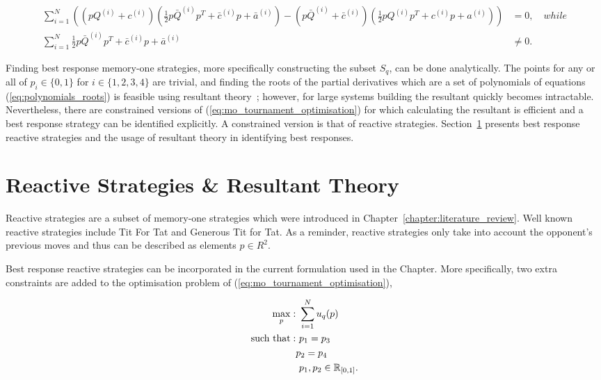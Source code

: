 {\scriptsize
\begin{align}\label{eq:polynomials_roots}
    \displaystyle\sum\limits_{i=1} ^ {N} \left(
    \left(pQ^{(i)} + c^{(i)}\right) \left(\frac{1}{2} p\bar{Q}^{(i)} p^T + \bar{c}^{(i)} p + \bar{a}^ {(i)}\right)
    - \left(p\bar{Q}^{(i)} + \bar{c}^{(i)}\right) \left(\frac{1}{2} pQ^{(i)} p^T + c^{(i)} p + a^ {(i)}\right)\right)
    &= 0, \quad {while} \\
    \displaystyle\sum\limits_{i=1} ^ {N} \frac{1}{2} p\bar{Q}^{(i)} p^T + \bar{c}^{(i)} p + \bar{a}^ {(i)} &\neq 0.
\end{align}}

Finding best response memory-one strategies, more specifically constructing the
subset \(S_q\), can be done analytically. The points for any or all of \(p_i \in
\{0, 1\}\) for \(i \in \{1, 2, 3, 4\}\) are trivial, and finding the
roots of the partial derivatives which are a set of polynomials of equations
(\ref{eq:polynomials_roots}) is feasible using resultant
theory~\cite{Jonsson2005}; however, for large systems building the resultant
quickly becomes intractable. Nevertheless, there are constrained versions of
(\ref{eq:mo_tournament_optimisation}) for which calculating
the resultant is efficient and a best response strategy can be identified
explicitly. A constrained version is that of reactive strategies.
Section~\ref{section:reactive_strategies} presents best response
reactive strategies and the usage of resultant theory in identifying best
responses.

\section{Reactive Strategies \& Resultant Theory}\label{section:reactive_strategies}

Reactive strategies are a subset of memory-one strategies which were introduced
in Chapter~\ref{chapter:literature_review}. Well known reactive strategies
include Tit For Tat and Generous Tit for Tat. As a reminder, reactive strategies
only take into account the opponent's previous moves and thus can be described
as elements \(p \in R^2\).

Best response reactive strategies can be incorporated in the current formulation
used in the Chapter. More specifically, two extra constraints are added to the
optimisation problem of (\ref{eq:mo_tournament_optimisation}),

\begin{equation}\label{eq:reactive_tournament_optimisation}
\begin{aligned}
\max_p: & \ \sum_{i=1} ^ N u_q(p)
\\
\text{such that}: & \ p_1 = p_3 \\
                  &  p_2 = p_4\\
                  & \ p_1, p_2 \in \mathbb{R}_{[0, 1]}.
\end{aligned}
\end{equation}

